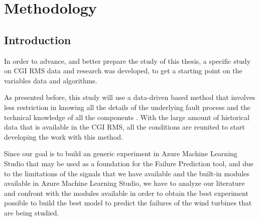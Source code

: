 


\chapter{Methodology}
\label{cha:introduction}

\section{Introduction} 
\label{sub:if_you_use_this_template} 
In order to advance, and better prepare the study of this thesis, a specific study on CGI RMS data and research was developed, to get a starting point on the variables data and algorithms.

As presented before, this study will use a data-driven based method that involves less restriction in knowing all the details of the underlying fault process and the technical knowledge of all the components \cite{OLD_19_WIND}. With the large amount of historical data that is available in the CGI RMS, all the conditions are reunited to start developing the work with this method.

Since our goal is to build an generic experiment in Azure Machine Learning Studio that may be used as a foundation for the Failure Prediction tool, and due to the limitations of the signals that we have available and the built-in modules available in Azure Machine Learning Studio, we have to analyze our literature and confront with the modules available in order to obtain the best experiment possible to build the best model to predict the failures of the wind turbines that are being studied.




